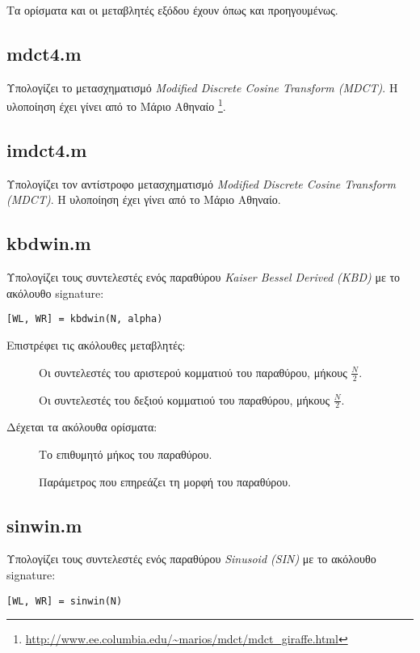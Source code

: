 \noindent Τα ορίσματα και οι μεταβλητές εξόδου έχουν όπως και προηγουμένως.


\subsection*{mdct4.m}
Υπολογίζει το μετασχηματισμό \emph{Modified Discrete Cosine Transform (MDCT)}. Η
υλοποίηση έχει γίνει από το Μάριο Αθηναίο
\footnote{\label{f1}\url{http://www.ee.columbia.edu/~marios/mdct/mdct_giraffe.html}}.


\subsection*{imdct4.m}
Υπολογίζει τον αντίστροφο μετασχηματισμό \emph{Modified Discrete Cosine
Transform (MDCT)}. Η υλοποίηση έχει γίνει από το Μάριο Αθηναίο.


\subsection*{kbdwin.m}
Υπολογίζει τους συντελεστές ενός παραθύρου \emph{Kaiser Bessel Derived (KBD)}
με το ακόλουθο signature:
\begin{center}
	\verb|[WL, WR] = kbdwin(N, alpha)|
\end{center}

\noindent Επιστρέφει τις ακόλουθες μεταβλητές:
\begin{description}
\item[] Οι συντελεστές του αριστερού κομματιού του παραθύρου, μήκους
	$\frac{N}{2}$.
\item[] Οι συντελεστές του δεξιού κομματιού του παραθύρου, μήκους
	$\frac{N}{2}$.
\end{description}

\noindent Δέχεται τα ακόλουθα ορίσματα:
\begin{description}
\item[] Το επιθυμητό μήκος του παραθύρου.
\item[] Παράμετρος που επηρεάζει τη μορφή του παραθύρου.
\end{description}


\subsection*{sinwin.m}
Υπολογίζει τους συντελεστές ενός παραθύρου \emph{Sinusoid (SIN)} με το ακόλουθο
signature:
\begin{center}
	\verb|[WL, WR] = sinwin(N)|
\end{center}

